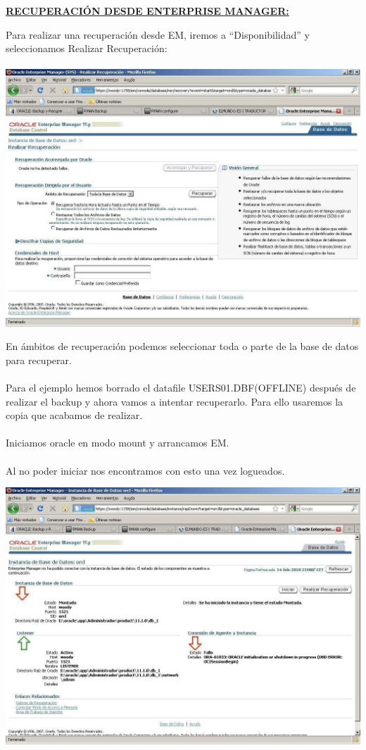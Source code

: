 \documentclass[12pt,letterpaper]{article}
\begin{document}
{\begin{enumerate}
\bf\underline{RECUPERACIÓN  DESDE  ENTERPRISE  MANAGER:}
\end{enumerate}
Para realizar una recuperación desde EM, iremos a “Disponibilidad” y seleccionamos Realizar Recuperación: \\
\\
\includegraphics[width=14cm]{./IMG/img40.jpg}

En ámbitos de recuperación podemos seleccionar toda o parte de la base de datos para recuperar. \\
\\
Para  el  ejemplo  hemos  borrado  el  datafile  USERS01.DBF(OFFLINE)  después  de realizar el backup y ahora vamos a intentar recuperarlo. Para ello usaremos la copia que acabamos de realizar. \\
\\
Iniciamos oracle en modo mount y arrancamos EM. \\
\\
Al no poder iniciar nos encontramos con esto una vez logueados.

\includegraphics[width=14cm]{./IMG/img41.jpg}

}
\end{document}

